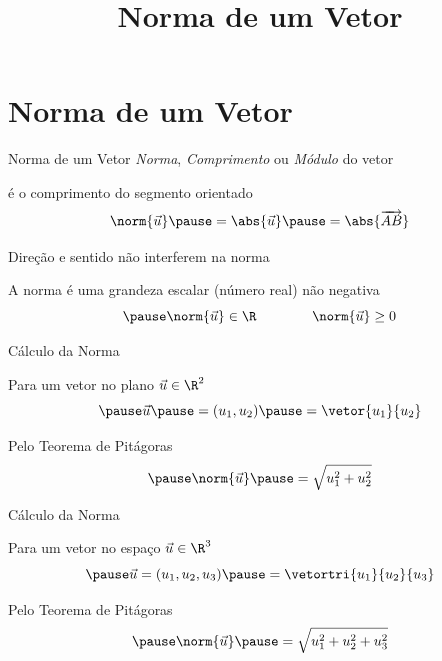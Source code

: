 \documentclass[fleqn,aspectratio=169,12pt]{beamer}
\title{Norma de um Vetor}
\begin{document}
\addtitle

\section{Norma de um Vetor}

\begin{frame}{Norma de um Vetor}
  \emph{Norma}, \emph{Comprimento} ou \emph{Módulo} do vetor

  \pause
  é o comprimento do segmento orientado
  \pause
  \[
    \norm{\vec{u}}
    \pause
    = \abs{\vec{u}}
    \pause
    = \abs{\overrightarrow{AB}}
  \]

  \pause
  Direção e sentido não interferem na norma

  \pause
  A norma é uma grandeza escalar (número real) não negativa
  \[
    \pause
    \norm{\vec{u}} \in \R
    \qquad\qquad
    \norm{\vec{u}} \geq 0
  \]
\end{frame}


\begin{frame}[t]{Cálculo da Norma}
  \vspace{1\baselineskip}

  Para um vetor no plano $\vec{u} \in \R^2$
  \[
    \pause
    \vec{u}
    \pause
    = ( u_1, u_2 )
    \pause
    = \vetor{u_1}{u_2}
  \]

  \pause
  Pelo Teorema de Pitágoras
  \[
    \pause
    \norm{\vec{u}}
    \pause
    = \sqrt{ u_1^2 + u_2^2 }
  \]
\end{frame}

\begin{frame}[t]{Cálculo da Norma}
  \vspace{1\baselineskip}

  Para um vetor no espaço $\vec{u} \in \R^3$
  \[
    \pause
    \vec{u}
    = ( u_1, u_2, u_3 )
    \pause
    = \vetortri{u_1}{u_2}{u_3}
  \]

  \pause
  Pelo Teorema de Pitágoras
  \[
    \pause
    \norm{\vec{u}}
    \pause
    = \sqrt{ u_1^2 + u_2^2 + u_3^2 }
  \]
\end{frame}
\end{document}
